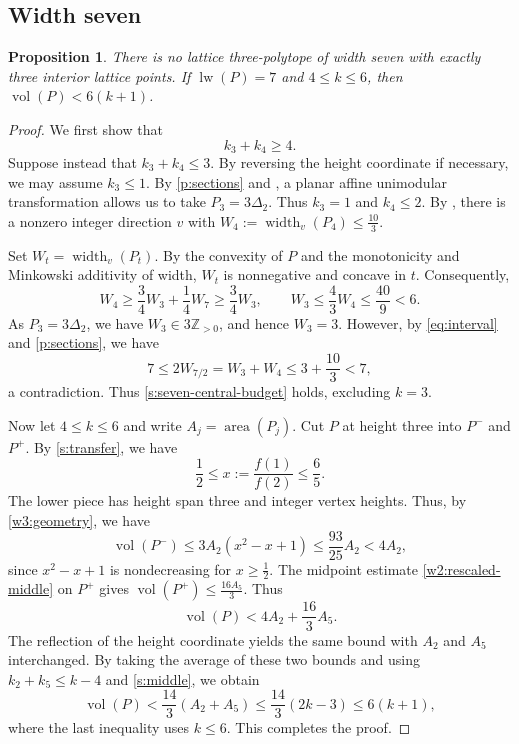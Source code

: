\documentclass[reqno, 11pt]{article}
\numberwithin{equation}{section}
\newtheorem{proposition}[proposition]{Proposition}
\theoremstyle{definition}
\newcommand{\Z}{\mathbb Z}
\DeclareMathOperator{\vol}{vol}
\DeclareMathOperator{\area}{area}
\DeclareMathOperator{\lw}{lw}
\numberwithin{equation}{section}
\begin{document}
\subsection{Width seven}
\begin{proposition}\label{s:seven}
There is no lattice three-polytope of width seven with exactly
three interior lattice points. If $\lw(P)=7$ and $4\le k\le6$,
then $\vol(P)<6(k+1)$.
\end{proposition}


\begin{proof}
We first show that
\begin{equation}\label{s:seven-central-budget}
k_3+k_4\ge4.
\end{equation}
Suppose instead that $k_3+k_4\le3$. By reversing the height coordinate if necessary, we may assume $k_3\le1$.
By \cref{p:sections} and \cite[Theorem~1.1]{ACFH2026},
a planar affine unimodular transformation allows us to take $P_3=3\Delta_2$. Thus $k_3=1$ and $k_4\le2$.
By \cite[Theorem~B]{ACFH2026}, there is a nonzero
integer direction $v$ with
$W_4:=\operatorname{width}_v(P_4)\le\frac{10}{3}$.

Set $W_t=\operatorname{width}_v(P_t)$. By the convexity of $P$ and the monotonicity and Minkowski additivity of width, $W_t$ is nonnegative and concave in $t$. Consequently,
\[
W_4\ge\frac34W_3+\frac14W_7\ge\frac34W_3,
\qquad
W_3\le\frac43W_4\le\frac{40}{9}<6.
\]
As $P_3=3\Delta_2$, we have $W_3\in3\Z_{>0}$,
and hence $W_3=3$. However, by \eqref{eq:interval} and \cref{p:sections}, we have
\[
7\le2W_{7/2}=W_3+W_4
\le3+\frac{10}{3}<7,
\]
a contradiction. Thus \eqref{s:seven-central-budget} holds, excluding $k=3$.

Now let $4\le k\le6$ and write $A_j=\area(P_j)$.
Cut $P$ at height three into $P^-$ and $P^+$.
By \eqref{s:transfer}, we have
\[
\frac12\le x:=\frac{f(1)}{f(2)}\le\frac65.
\]
The lower piece has height span three and integer vertex heights. Thus, by \cref{w3:geometry}, we have
\[
\vol(P^-)\le3A_2(x^2-x+1)
\le\frac{93}{25}A_2<4A_2,
\]
since $x^2-x+1$ is nondecreasing for $x\ge\frac{1}{2}$.
The midpoint estimate \eqref{w2:rescaled-middle}
on $P^+$ gives $\vol(P^+)\le\frac{16A_5}{3}$.
Thus
\[
\vol(P)<4A_2+\frac{16}{3}A_5.
\]
The reflection of the height coordinate yields the same bound with $A_2$ and $A_5$ interchanged. By taking the average of these two bounds and using $k_2+k_5\le k-4$ and \eqref{s:middle}, we obtain
\[
\vol(P)<\frac{14}{3}(A_2+A_5)\le\frac{14}{3}(2k-3)\le6(k+1),
\]
where the last inequality uses $k\le6$.
This completes the proof.
\end{proof}
\end{document}
